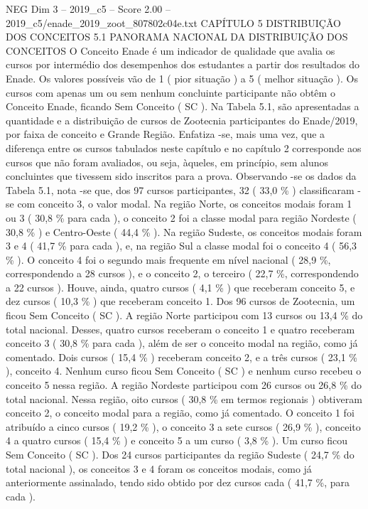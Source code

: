 \begin{textsample}{NEG Dim 3 – 2019\_c5 – Score 2.00 – 2019\_c5/enade\_2019\_zoot\_807802c04e.txt}  \label{ex:f3_neg_192}
CAPÍTULO 5 DISTRIBUIÇÃO DOS CONCEITOS 5.1 PANORAMA NACIONAL DA DISTRIBUIÇÃO DOS CONCEITOS O Conceito Enade é um indicador de qualidade que avalia os cursos por intermédio dos desempenhos dos estudantes a partir dos resultados do Enade.
Os valores possíveis vão de 1 ( pior situação ) a 5 ( melhor situação ).
Os cursos com apenas um ou sem nenhum concluinte participante não obtêm o Conceito Enade, ficando Sem Conceito ( SC ).
Na Tabela 5.1, são apresentadas a quantidade e a distribuição de cursos de Zootecnia participantes do Enade/2019, por faixa de conceito e Grande Região.
Enfatiza -se, mais uma vez, que a diferença entre os cursos tabulados neste capítulo e no capítulo 2 corresponde aos cursos que não foram avaliados, ou seja, àqueles, em princípio, sem alunos concluintes que tivessem sido inscritos para a prova.
Observando -se os dados da Tabela 5.1, nota -se que, dos 97 cursos participantes, 32 ( 33,0 \% ) classificaram -se com conceito 3, o valor modal.
Na região Norte, os conceitos modais foram 1 ou 3 ( 30,8 \% para cada ), o conceito 2 foi a classe modal para região Nordeste ( 30,8 \% ) e Centro-Oeste ( 44,4 \% ).
Na região Sudeste, os conceitos modais foram 3 e 4 ( 41,7 \% para cada ), e, na região Sul a classe modal foi o conceito 4 ( 56,3 \% ).
O conceito 4 foi o segundo mais frequente em nível nacional ( 28,9 \%, correspondendo a 28 cursos ), e o conceito 2, o terceiro ( 22,7 \%, correspondendo a 22 cursos ).
Houve, ainda, quatro cursos ( 4,1 \% ) que receberam conceito 5, e dez cursos ( 10,3 \% ) que receberam conceito 1.
Dos 96 cursos de Zootecnia, um ficou Sem Conceito ( SC ).
A região Norte participou com 13 cursos ou 13,4 \% do total nacional.
Desses, quatro cursos receberam o conceito 1 e quatro receberam conceito 3 ( 30,8 \% para cada ), além de ser o conceito modal na região, como já comentado.
Dois cursos ( 15,4 \% ) receberam conceito 2, e a três cursos ( 23,1 \% ), conceito 4.
Nenhum curso ficou Sem Conceito ( SC ) e nenhum curso recebeu o conceito 5 nessa região.
A região Nordeste participou com 26 cursos ou 26,8 \% do total nacional.
Nessa região, oito cursos ( 30,8 \% em termos regionais ) obtiveram conceito 2, o conceito modal para a região, como já comentado.
O conceito 1 foi atribuído a cinco cursos ( 19,2 \% ), o conceito 3 a sete cursos ( 26,9 \% ), conceito 4 a quatro cursos ( 15,4 \% ) e conceito 5 a um curso ( 3,8 \% ).
Um curso ficou Sem Conceito ( SC ).
Dos 24 cursos participantes da região Sudeste ( 24,7 \% do total nacional ), os conceitos 3 e 4 foram os conceitos modais, como já anteriormente assinalado, tendo sido obtido por dez cursos cada ( 41,7 \%, para cada ).

\end{textsample}
